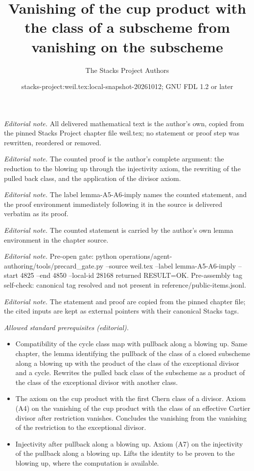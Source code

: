 \documentclass[10pt,a4paper]{amsart}
\title{Vanishing of the cup product with the class of a subscheme from vanishing on the subscheme}
\author{The Stacks Project Authors}
\date{stacks-project:weil.tex:local-snapshot-20261012; GNU FDL 1.2 or later}
\theoremstyle{plain}
\theoremstyle{definition}
\theoremstyle{remark}
\numberwithin{equation}{subsection}
\begin{document}
\maketitle
\noindent\textit{Editorial note.} All delivered mathematical text is the author's own, copied from the pinned Stacks Project chapter file weil.tex; no statement or proof step was rewritten, reordered or removed.\par\medskip
\noindent\textit{Editorial note.} The counted proof is the author's complete argument: the reduction to the blowing up through the injectivity axiom, the rewriting of the pulled back class, and the application of the divisor axiom.\par\medskip
\noindent\textit{Editorial note.} The label lemma-A5-A6-imply names the counted statement, and the proof environment immediately following it in the source is delivered verbatim as its proof.\par\medskip
\noindent\textit{Editorial note.} The counted statement is carried by the author's own lemma environment in the chapter source.\par\medskip
\noindent\textit{Editorial note.} Pre-open gate: python operations/agent-authoring/tools/precard\_gate.py --source weil.tex --label lemma-A5-A6-imply --start 4825 --end 4850 --local-id 28168 returned RESULT=OK. Pre-assembly tag self-check: canonical tag resolved and not present in reference/public-items.jsonl.\par\medskip
\noindent\textit{Editorial note.} The statement and proof are copied from the pinned chapter file; the cited inputs are kept as external pointers with their canonical Stacks tags.\par\medskip
\noindent\textit{Allowed standard prerequisites (editorial).}\begin{itemize}
\item Compatibility of the cycle class map with pullback along a blowing up. Same chapter, the lemma identifying the pullback of the class of a closed subscheme along a blowing up with the product of the class of the exceptional divisor and a cycle. Rewrites the pulled back class of the subscheme as a product of the class of the exceptional divisor with another class.
\item The axiom on the cup product with the first Chern class of a divisor. Axiom (A4) on the vanishing of the cup product with the class of an effective Cartier divisor after restriction vanishes. Concludes the vanishing from the vanishing of the restriction to the exceptional divisor.
\item Injectivity after pullback along a blowing up. Axiom (A7) on the injectivity of the pullback along a blowing up. Lifts the identity to be proven to the blowing up, where the computation is available.
\end{itemize}\medskip
\end{document}
